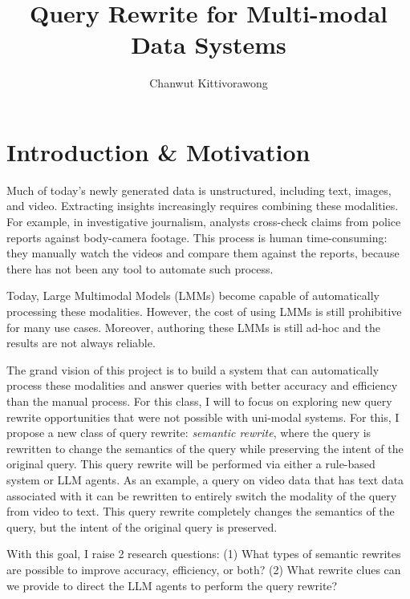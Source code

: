 \documentclass[sigconf,nonacm,screen]{acmart}
\begin{document}
\title{Query Rewrite for Multi-modal Data Systems}
\author{Chanwut Kittivorawong}
\renewcommand{\shortauthors}{Chanwut Kittivorawong}

\makeatletter
\renewcommand{\@mkauthors}{}
\makeatother

\maketitle

\section{Introduction \& Motivation}
Much of today's newly generated data is unstructured, including text, images, and video. 
Extracting insights increasingly requires combining these modalities. 
For example, in investigative journalism, analysts cross-check claims from police reports against body-camera footage. 
This process is human time-consuming: they manually watch the videos and compare
them against the reports, because there has not been any tool to automate such process.

Today, Large Multimodal Models (LMMs) become capable of automatically processing these modalities.
However, the cost of using LMMs is still prohibitive for many use cases.
Moreover, authoring these LMMs is still ad-hoc and the results are not always reliable.

The grand vision of this project is to build a system that can automatically process
these modalities and answer queries with better accuracy and efficiency than the manual process.
For this class, I will to focus on exploring new query rewrite opportunities that were not possible with uni-modal systems.
For this, I propose a new class of query rewrite: {\em semantic rewrite}, where the
query is rewritten to change the semantics of the query while preserving the intent of the original query.
This query rewrite will be performed via either a rule-based system or LLM agents.
As an example, a query on video data that has text data associated with it can
be rewritten to entirely switch the modality of the query from video to text.
This query rewrite completely changes the semantics of the query,
but the intent of the original query is preserved.

With this goal, I raise 2 research questions:
(1) What types of semantic rewrites are possible to improve accuracy, efficiency, or both?
(2) What rewrite clues can we provide to direct the LLM agents to perform the query rewrite?
\end{document}
